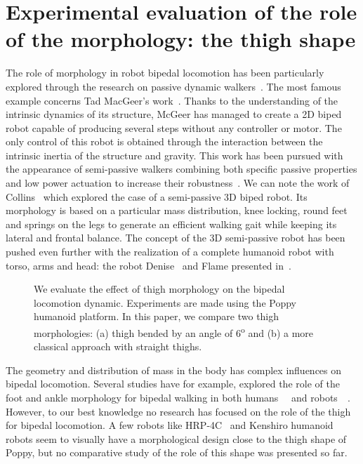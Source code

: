 
\newpage
\section{Experimental evaluation of the role of the morphology: the thigh shape} %
\label{sec:morphology-role}

The role of morphology in robot bipedal locomotion has been particularly explored through the research on passive dynamic walkers~\parencite{wisse2007passive}. The most famous example concerns Tad MacGeer's work~\parencite{mcgeer1990passive}. Thanks to the understanding of the intrinsic dynamics of its structure, McGeer has managed to create a 2D biped robot capable of producing several steps without any controller or motor.
The only control of this robot is obtained through the interaction between the intrinsic inertia of the structure and gravity.
This work has been pursued with the appearance of semi-passive walkers combining both specific passive properties and low power actuation to increase their robustness~\parencite{Anderson2005}. We can note the work of Collins~\parencite{collins2005bipedal} which explored the case of a semi-passive 3D biped robot. Its morphology is based on a particular mass distribution, knee locking, round feet and springs on the legs to generate an efficient walking gait while keeping its lateral and frontal balance.
The concept of the 3D semi-passive robot has been pushed even further with the realization of a complete humanoid robot with torso, arms and head: the robot Denise~\parencite{wisse2005three} and Flame presented in~\parencite{Hobbelen2008}.

\begin{figure}[!t]
\centering
    \hfil
    \caption{We evaluate the effect of thigh morphology on the bipedal locomotion dynamic.
    Experiments are made using the Poppy humanoid platform.
    In this paper, we compare two thigh morphologies: (a) thigh bended by an angle of 6\textsuperscript{o} and (b) a more classical approach with straight thighs.}
    \label{fig:poppy_compared}
\end{figure}


The geometry and distribution of mass in the body has complex influences on bipedal locomotion. Several studies have for example, explored the role of the foot and ankle morphology for bipedal walking in both humans~\parencite{Adamczyk2006}~\parencite{Hughes1990} and robots~\parencite{hobbelen2005ankle}~\parencite{Davis2010}. However, to our best knowledge no research has focused on the role of the thigh for bipedal locomotion.  A few robots like HRP-4C~\parencite{kaneko2009cybernetic} and Kenshiro humanoid~\parencite{nakanishi2013design} robots seem to visually have a morphological design close to the thigh shape of Poppy, but no comparative study of the role of this shape was presented so far.

